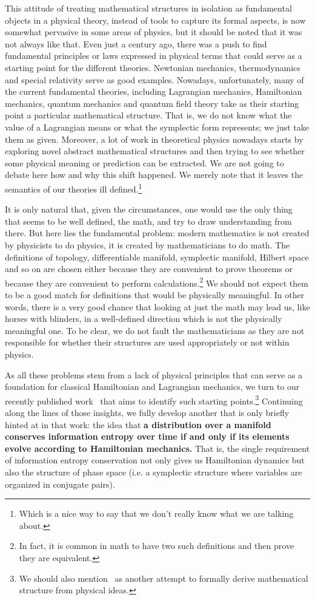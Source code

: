 \documentclass[11pt]{elsarticle}
\begin{document}
This attitude of treating mathematical structures in isolation as fundamental objects in a physical theory, instead of tools to capture its formal aspects, is now somewhat pervasive in some areas of physics, but it should be noted that it was not always like that. Even just a century ago, there was a push to find fundamental principles or laws expressed in physical terms that could serve as a starting point for the different theories. Newtonian mechanics, thermodynamics and special relativity serve as good examples. Nowadays, unfortunately, many of the current fundamental theories, including Lagrangian mechanics, Hamiltonian mechanics, quantum mechanics and quantum field theory take as their starting point a particular mathematical structure. That is, we do not know what the value of a Lagrangian means or what the symplectic form represents; we just take them as given. Moreover, a lot of work in theoretical physics nowadays starts by exploring novel abstract mathematical structures and then trying to see whether some physical meaning or prediction can be extracted. We are not going to debate here how and why this shift happened. We merely note that it leaves the semantics of our theories ill defined.\footnote{Which is a nice way to say that we don't really know what we are talking about.} 

It is only natural that, given the circumstances, one would use the only thing that seems to be well defined, the math, and try to draw understanding from there. But here lies the fundamental problem: modern mathematics is not created by physicists to do physics, it is created by mathematicians to do math. The definitions of topology, differentiable manifold, symplectic manifold, Hilbert space and so on are chosen either because they are convenient to prove theorems or because they are convenient to perform calculations.\footnote{In fact, it is common in math to have two such definitions and then prove they are equivalent.} We should not expect them to be a good match for definitions that would be physically meaningful. In other words, there is a very good chance that looking at just the math may lead us, like horses with blinders, in a well-defined direction which is not the physically meaningful one. To be clear, we do not fault the mathematicians as they are not responsible for whether their structures are used appropriately or not within physics.

As all these problems stem from a lack of physical principles that can serve as a foundation for classical Hamiltonian and Lagrangian mechanics, we turn to our recently published work~\cite{AoPPhy1} that aims to identify such starting points.\footnote{We should also mention~\cite{Maudlin} as another attempt to formally derive mathematical structure from physical ideas.} Continuing along the lines of those insights, we fully develop another that is only briefly hinted at in that work: the idea that \textbf{a distribution over a manifold conserves information entropy over time if and only if its elements evolve according to Hamiltonian mechanics.} That is, the single requirement of information entropy conservation not only gives us Hamiltonian dynamics but also the structure of phase space (i.e. a symplectic structure where variables are organized in conjugate pairs).
\end{document}
